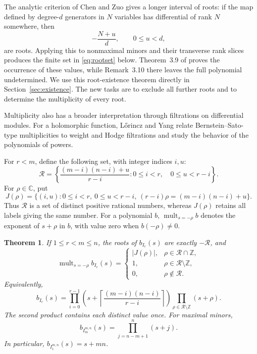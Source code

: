 \documentclass[11pt,a4paper]{article}
\numberwithin{equation}{section}
\newtheorem{maintheorem}{Theorem}
\theoremstyle{definition}
\newcommand{\C}{\mathbb C}
\newcommand{\Z}{\mathbb Z}
\DeclareMathOperator{\mult}{mult}
\begin{document}
The analytic criterion of Chen and Zuo \cite{CZ} gives a longer interval
of roots: if the map defined by degree-$d$ generators in $N$
variables has differential of rank $N$ somewhere, then
\[
-\frac{N+u}{d},\qquad 0\le u<d,
\]
are roots. Applying this to nonmaximal minors and their transverse
rank slices produces the finite set in \eqref{eq:rootset} below.
Theorem~3.9 of \cite{CZ} proves the occurrence of these values, while
Remark~3.10 there leaves the full polynomial undetermined. We use this
root-existence theorem directly in Section~\ref{sec:existence}.
The new tasks are to exclude all further roots and to determine
the multiplicity of every root.

Multiplicity also has a broader interpretation through filtrations
on differential modules. For a holomorphic function,
L\H orincz and Yang \cite{LY} relate Bernstein--Sato-type
multiplicities to weight and Hodge filtrations and study the behavior
of the polynomials of powers.

For $r<m$, define the following set, with integer indices $i,u$:
\begin{equation}\label{eq:rootset}
\mathcal R=\left\{\frac{(m-i)(n-i)+u}{r-i}:
          0\le i<r,\quad 0\le u<r-i\right\}.
\end{equation}
For $\rho\in\C$, put
\[
J(\rho)=\{(i,u):0\le i<r,\ 0\le u<r-i,
                  \ (r-i)\rho=(m-i)(n-i)+u\}.
\]
Thus $\mathcal R$ is a set of distinct positive rational numbers,
whereas $J(\rho)$ retains all labels giving the same number. For a
polynomial $b$, $\mult_{s=-\rho}b$ denotes the exponent of $s+\rho$
in $b$, with value zero when $b(-\rho)\ne0$.

\begin{maintheorem}\label{thm:main}
If $1\le r<m\le n$, the roots of $b_{I_r}(s)$ are exactly $-\mathcal R$,
and
\begin{equation}\label{eq:multiplicity}
\mult_{s=-\rho}b_{I_r}(s)=
\begin{cases}
|J(\rho)|,&\rho\in\mathcal R\cap\Z,\\
1,&\rho\in\mathcal R\setminus\Z,\\
0,&\rho\notin\mathcal R.
\end{cases}
\end{equation}
Equivalently,
\begin{equation}\label{eq:mainproduct}
b_{I_r}(s)=
\prod_{i=0}^{r-1}\left(s+\left\lceil
              \frac{(m-i)(n-i)}{r-i}\right\rceil\right)
\prod_{\rho\in\mathcal R\setminus\Z}(s+\rho).
\end{equation}
The second product contains each distinct value once. For maximal minors,
\begin{equation}\label{eq:maximal}
b_{I_m^{m,n}}(s)=\prod_{j=n-m+1}^{n}(s+j).
\end{equation}
In particular, $b_{I_1^{m,n}}(s)=s+mn$.
\end{maintheorem}
\end{document}
